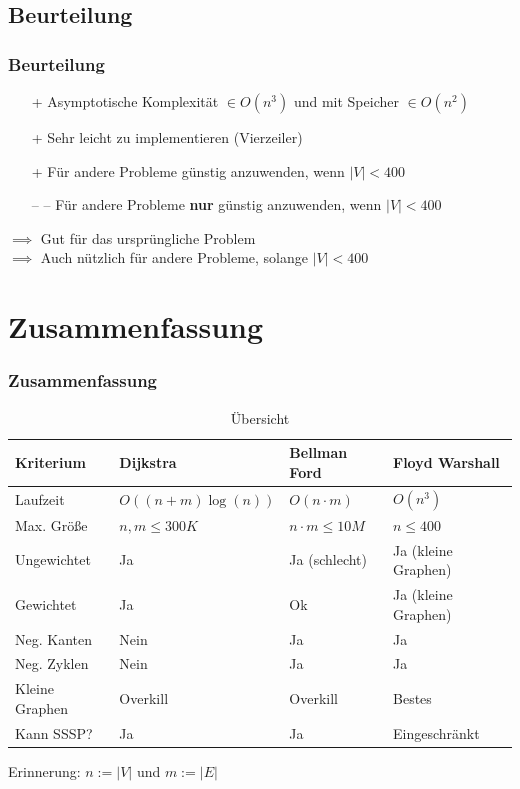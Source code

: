 
\subsection{Beurteilung} 

\begin{frame}
\frametitle{Beurteilung}
\begin{itemize}

\item[+] Asymptotische Komplexität $\in O(n^3)$  und mit Speicher $\in O(n^2)$
\item[+] Sehr leicht zu implementieren (Vierzeiler)
\item[+] Für andere Probleme günstig anzuwenden, wenn $|V|< 400$
\item[-- --] Für andere Probleme \textbf{nur} günstig anzuwenden, wenn $|V|< 400$
\end{itemize}

$\implies$ Gut für das ursprüngliche Problem\\
$\implies$ Auch nützlich für andere Probleme, solange $|V| < 400$
\end{frame}


\section{Zusammenfassung}

\begin{frame}
\frametitle{Zusammenfassung}
\footnotesize{\begin{table}
\begin{tabular}{l l l l}
\toprule
\textbf{Kriterium} & \textbf{Dijkstra} & \textbf{Bellman Ford} &\textbf{Floyd Warshall}\\
\midrule
Laufzeit & $O((n+m)\log(n))$ & $O(n \cdot m)$ & $O(n^3)$ \\
Max. Größe  & $n,m \leq 300K$ & $n \cdot m \leq 10M$ & $n \leq 400$ \\
Ungewichtet & Ja & Ja (schlecht) & Ja (kleine Graphen) \\
Gewichtet & Ja & Ok & Ja (kleine Graphen) \\
Neg. Kanten & Nein & Ja & Ja \\
Neg. Zyklen & Nein & Ja & Ja \\
Kleine Graphen & Overkill & Overkill & Bestes \\
Kann SSSP? & Ja & Ja & Eingeschränkt \\
\bottomrule
\end{tabular}
\caption{Übersicht}
\end{table}}
Erinnerung: $n:= |V|$ und $m:= |E|$
\end{frame}

